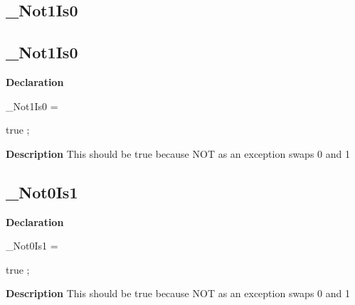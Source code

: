 \documentclass{report}
\newif\ifpdf
\begin{document}
\subsection*{\large{\textbf{{\_}Not1Is0}}\normalsize\hspace{1ex}\hrulefill}
\else
\subsection*{{\_}Not1Is0}
\fi
\label{ok_if_expressions_2-_Not1Is0}
\begin{list}{}{
\setlength{\itemindent}{0cm}
\setlength{\listparindent}{0cm}
\setlength{\leftmargin}{\evensidemargin}
\addtolength{\leftmargin}{\tmplength}
\settowidth{\labelsep}{X}
\addtolength{\leftmargin}{\labelsep}
\setlength{\labelwidth}{\tmplength}
}
\item[\textbf{Declaration}\hfill]
\ifpdf
\begin{flushleft}
\fi
\begin{ttfamily}
{\_}Not1Is0 =

true
;\end{ttfamily}

\ifpdf
\end{flushleft}
\fi

\par
\item[\textbf{Description}]
This should be true because NOT as an exception swaps 0 and 1

\end{list}
\ifpdf
\subsection*{\large{\textbf{{\_}Not0Is1}}\normalsize\hspace{1ex}\hrulefill}
\else
\subsection*{{\_}Not0Is1}
\fi
\label{ok_if_expressions_2-_Not0Is1}
\begin{list}{}{
\setlength{\itemindent}{0cm}
\setlength{\listparindent}{0cm}
\setlength{\leftmargin}{\evensidemargin}
\addtolength{\leftmargin}{\tmplength}
\settowidth{\labelsep}{X}
\addtolength{\leftmargin}{\labelsep}
\setlength{\labelwidth}{\tmplength}
}
\item[\textbf{Declaration}\hfill]
\ifpdf
\begin{flushleft}
\fi
\begin{ttfamily}
{\_}Not0Is1 =

true
;\end{ttfamily}

\ifpdf
\end{flushleft}
\fi

\par
\item[\textbf{Description}]
This should be true because NOT as an exception swaps 0 and 1

\end{list}
\ifpdf
\end{document}
